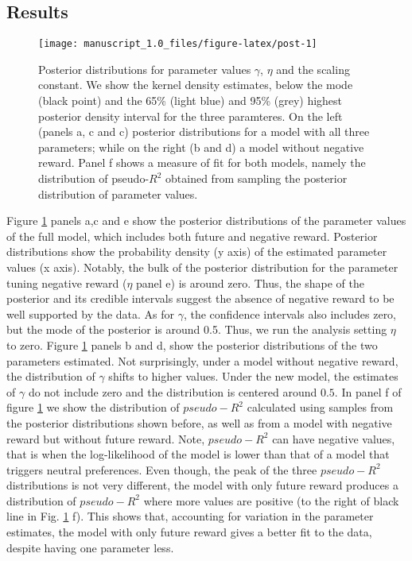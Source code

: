 \documentclass[]{rsos}%
\begin{document}
\hypertarget{results}{%
\subsection{Results}\label{results}}

\begin{figure}

{\centering \texttt{[image: manuscript\_1.0\_files/figure-latex/post-1]} 

}

\caption{Posterior distributions for parameter values $\gamma$, $\eta$ and the scaling constant. We show the kernel density estimates, below the mode (black point) and the 65\% (light blue) and 95\% (grey)  highest posterior density interval for the three paramteres. On the left (panels a, c and c) posterior distributions for a model with all three parameters; while on the right (b and d) a model without negative reward. Panel f shows a measure of fit for both models, namely the distribution of pseudo-$R^2$ obtained from sampling the posterior distribution of parameter values.}\label{fig:post}
\end{figure}

Figure \ref{fig:post} panels a,c and e show the posterior distributions
of the parameter values of the full model, which includes both future
and negative reward. Posterior distributions show the probability
density (y axis) of the estimated parameter values (x axis). Notably,
the bulk of the posterior distribution for the parameter tuning negative
reward (\(\eta\) panel e) is around zero. Thus, the shape of the posterior
and its credible intervals suggest the absence of negative reward to be
well supported by the data. As for \(\gamma\), the confidence intervals
also includes zero, but the mode of the posterior is around 0.5. Thus,
we run the analysis setting \(\eta\) to zero. Figure \ref{fig:post} panels
b and d, show the posterior distributions of the two parameters
estimated. Not surprisingly, under a model without negative reward, the
distribution of \(\gamma\) shifts to higher values. Under the new model,
the estimates of \(\gamma\) do not include zero and the distribution is
centered around \(0.5\). In panel f of figure \ref{fig:post}
we show the distribution of \(pseudo-R^2\) calculated using
samples from the posterior distributions shown before,
as well as from a model with negative reward but without
future reward. Note, \(pseudo-R^2\) can have negative values, that is when
the log-likelihood of the model is lower than that of a model that
triggers neutral preferences. Even though, the peak of the three
\(pseudo-R^2\) distributions is not very different, the model with only
future reward produces a distribution of \(pseudo-R^2\) where more values
are positive (to the right of black line in Fig. \ref{fig:post} f). This
shows that, accounting for variation in the parameter estimates, the
model with only future reward gives a better fit to the data, despite
having one parameter less.
\end{document}

